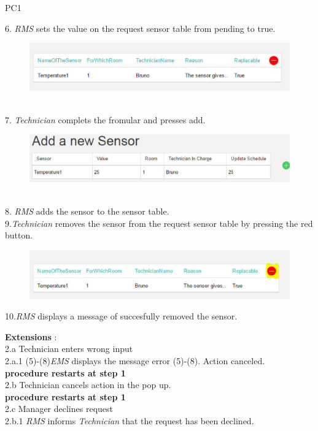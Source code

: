 \begin{lyxlist}{PC1}
{6. \emph{RMS} sets the value on the request sensor table from pending to true.\\
 \begin{figure}[h]
\includegraphics[width=1\textwidth]{images/AskForANewSensorTrue.eps}
\end{figure}\\

7. \emph{Technician} complets the fromular and presses add.\\
 \begin{figure}[h]
\includegraphics[width=1\textwidth]{images/AddANewSensorTechnician.eps}
\end{figure}\\

8. \emph{RMS} adds the sensor to the sensor table.\\

9.\emph{Technician} removes the sensor from the request sensor table by
pressing the red button.\\

 \begin{figure}[h]
\includegraphics[width=1\textwidth]{images/RemoveSensorFromSensorRequestListTechnician.eps}
\end{figure}

10.\emph{RMS} displays a message of succesfully removed the sensor.\\
\item [\textbf{Extensions}]:\\
2.a Technician enters wrong input\\
\hspace*{0.5cm} 2.a.1 (5)-(8)\emph{EMS} displays the message error (5)-(8).
Action canceled.\\
\hspace*{0.5cm} \textbf{procedure restarts at step 1}\\
2.b Technician cancels action in the pop up.\\
\hspace*{0.5cm} \textbf{procedure restarts at step 1}\\
2.c Manager declines request\\
\hspace*{0.5cm} 2.b.1 \emph{RMS} informs \emph{Technician} that the request
has been declined.\\
}
\end{lyxlist}
